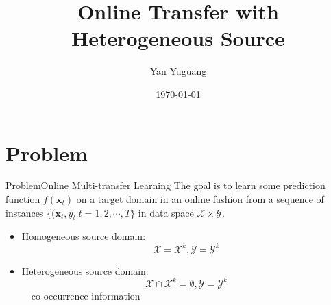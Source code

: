 \documentclass{beamer}
\begin{document}
\title[OHT]{Online Transfer with Heterogeneous Source}
\author[yanyg]{Yan Yuguang}
\date{\today}
\subject{Online Heterogeneous Transfer}


\maketitle


\section{Problem}
\begin{frame}{Problem}{Online Multi-transfer Learning}
The goal is to learn some prediction function $f(\mathbf{x}_t)$ on a target domain in an online fashion from a sequence of instances $\{(\mathbf{x}_t, y_t | t = 1, 2, \cdots, T\}$ in data space $\mathcal{X} \times \mathcal{Y}$.
\\
\begin{itemize}
\item
Homogeneous source domain: 
\\
$$\mathcal{X} = \mathcal{X}^k, \mathcal{Y} = \mathcal{Y}^k$$
\item
Heterogeneous source domain: 
\\
$$\mathcal{X} \cap \mathcal{X}^k = \emptyset, \mathcal{Y} = \mathcal{Y}^k$$
~~co-occurrence information \cite{ng2012co}
\end{itemize}
\end{frame}
\end{document}
